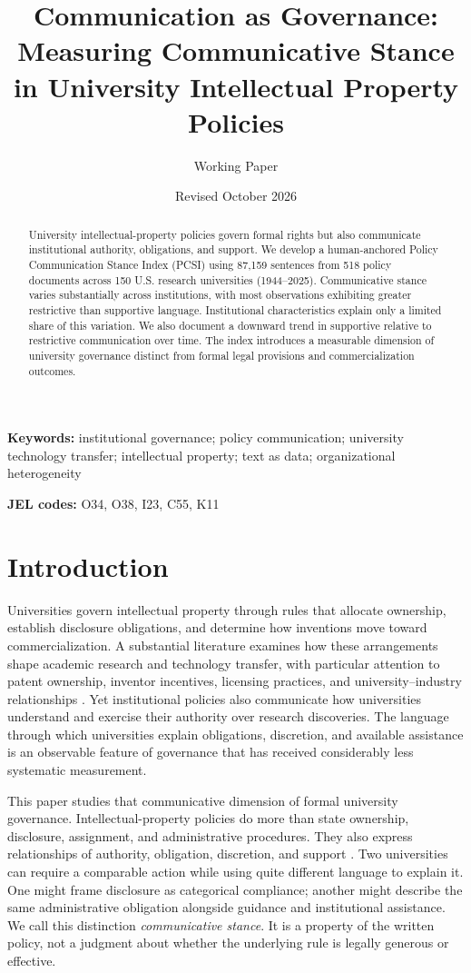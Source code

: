 \documentclass[11pt]{article}
\title{Communication as Governance:\\Measuring Communicative Stance in University Intellectual Property Policies}
\author{Working Paper}
\date{Revised October 2026}
\begin{document}
\maketitle
\begin{abstract}\noindent
University intellectual-property policies govern formal rights but also communicate institutional authority, obligations, and support. We develop a human-anchored Policy Communication Stance Index (PCSI) using 87,159 sentences from 518 policy documents across 150 U.S. research universities (1944--2025). Communicative stance varies substantially across institutions, with most observations exhibiting greater restrictive than supportive language. Institutional characteristics explain only a limited share of this variation. We also document a downward trend in supportive relative to restrictive communication over time. The index introduces a measurable dimension of university governance distinct from formal legal provisions and commercialization outcomes.
\end{abstract}
\noindent\textbf{Keywords:} institutional governance; policy communication; university technology transfer; intellectual property; text as data; organizational heterogeneity
\par\noindent\textbf{JEL codes:} O34, O38, I23, C55, K11

\section{Introduction}
Universities govern intellectual property through rules that allocate ownership, establish disclosure obligations, and determine how inventions move toward commercialization. A substantial literature examines how these arrangements shape academic research and technology transfer, with particular attention to patent ownership, inventor incentives, licensing practices, and university--industry relationships \citep{mowery2001,mowery2004,sampat2006,thursby2002,jensen2003,feldman2002,siegel2003,siegel2007,perkmann2013}. Yet institutional policies also communicate how universities understand and exercise their authority over research discoveries. The language through which universities explain obligations, discretion, and available assistance is an observable feature of governance that has received considerably less systematic measurement.

This paper studies that communicative dimension of formal university governance. Intellectual-property policies do more than state ownership, disclosure, assignment, and administrative procedures. They also express relationships of authority, obligation, discretion, and support \citep{smith2001,cooren2004,fairhurst2004}. Two universities can require a comparable action while using quite different language to explain it. One might frame disclosure as categorical compliance; another might describe the same administrative obligation alongside guidance and institutional assistance. We call this distinction \emph{communicative stance}. It is a property of the written policy, not a judgment about whether the underlying rule is legally generous or effective.
\end{document}
